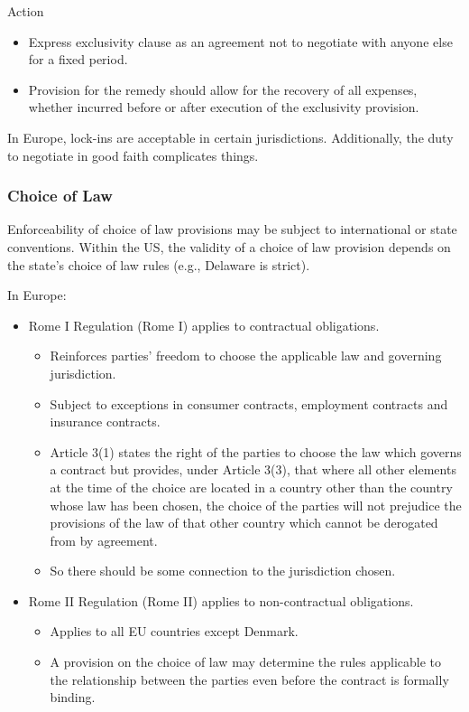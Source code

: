 \documentclass[
]{article}
\providecommand{\tightlist}{%
  \setlength{\itemsep}{0pt}\setlength{\parskip}{0pt}}
\begin{document}
Action

\begin{itemize}
\tightlist
\item
  Express exclusivity clause as an agreement not to negotiate with
  anyone else for a fixed period.
\item
  Provision for the remedy should allow for the recovery of all
  expenses, whether incurred before or after execution of the
  exclusivity provision.
\end{itemize}

In Europe, lock-ins are acceptable in certain jurisdictions.
Additionally, the duty to negotiate in good faith complicates things.

\hypertarget{choice-of-law}{%
\subsubsection{Choice of Law}\label{choice-of-law}}

Enforceability of choice of law provisions may be subject to
international or state conventions. Within the US, the validity of a
choice of law provision depends on the state's choice of law rules
(e.g., Delaware is strict).

In Europe:

\begin{itemize}
\tightlist
\item
  Rome I Regulation (Rome I) applies to contractual obligations.

  \begin{itemize}
  \tightlist
  \item
    Reinforces parties' freedom to choose the applicable law and
    governing jurisdiction.
  \item
    Subject to exceptions in consumer contracts, employment contracts
    and insurance contracts.
  \item
    Article 3(1) states the right of the parties to choose the law which
    governs a contract but provides, under Article 3(3), that where all
    other elements at the time of the choice are located in a country
    other than the country whose law has been chosen, the choice of the
    parties will not prejudice the provisions of the law of that other
    country which cannot be derogated from by agreement.
  \item
    So there should be some connection to the jurisdiction chosen.
  \end{itemize}
\item
  Rome II Regulation (Rome II) applies to non-contractual obligations.

  \begin{itemize}
  \tightlist
  \item
    Applies to all EU countries except Denmark.
  \item
    A provision on the choice of law may determine the rules applicable
    to the relationship between the parties even before the contract is
    formally binding.
  \end{itemize}
\end{itemize}
\end{document}
